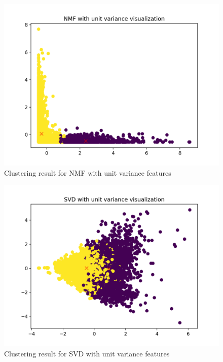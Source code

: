 \documentclass{report}
\begin{document}

\begin{figure}
  \includegraphics[width=\linewidth]{nmf_unitvar_4b.png} 
  \vspace*{-20mm}
  \caption{Clustering result for NMF with unit variance features}
  \label{fig:nmf2}
\end{figure}

\begin{figure}
  \includegraphics[width=\linewidth]{svd_unitvar_4b.png} 
  \vspace*{-20mm}
  \caption{Clustering result for SVD with unit variance features}
  \label{fig:svd2}
\end{figure}
\end{document}
